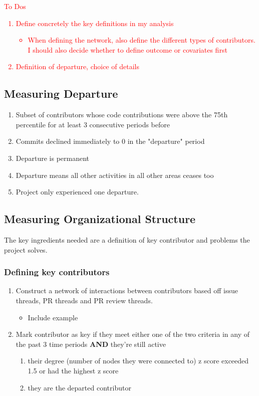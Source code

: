 \documentclass[12pt,notitlepage]{article}
\begin{document}
\textcolor{red}{To Dos
\begin{enumerate}
    \item Define concretely the key definitions in my analysis
    \begin{itemize} 
        \item When defining the network, also define the different types of contributors. I should also decide whether to define outcome or covariates first 
    \end{itemize}
    \item Definition of departure, choice of details 
\end{enumerate}}

\subsection{Measuring Departure}
\begin{enumerate}
    \item Subset of contributors whose code contributions were above the 75th percentile for at least 3 consecutive periods before
    \item Commits declined immediately to 0 in the "departure" period
    \item Departure is permanent
    \item Departure means all other activities in all other areas ceases too 
    \item Project only experienced one departure. 
\end{enumerate}
\subsection{Measuring Organizational Structure}
The key ingredients needed are a definition of key contributor and  problems the project solves. 
\subsubsection{Defining key contributors}
\begin{enumerate}
    \item Construct a network of interactions between contributors based off issue threads, PR threads and PR review threads.
    \begin{itemize}
        \item Include example
    \end{itemize}
    \item Mark contributor as key if they meet either one of the two criteria in any of the past 3 time periods \textbf{AND} they're still active
    \begin{enumerate}
        \item their degree (number of nodes they were connected to) z score exceeded 1.5 or had the highest z score 
        \item they are the departed contributor
    \end{enumerate} 
\end{enumerate}
\end{document}
